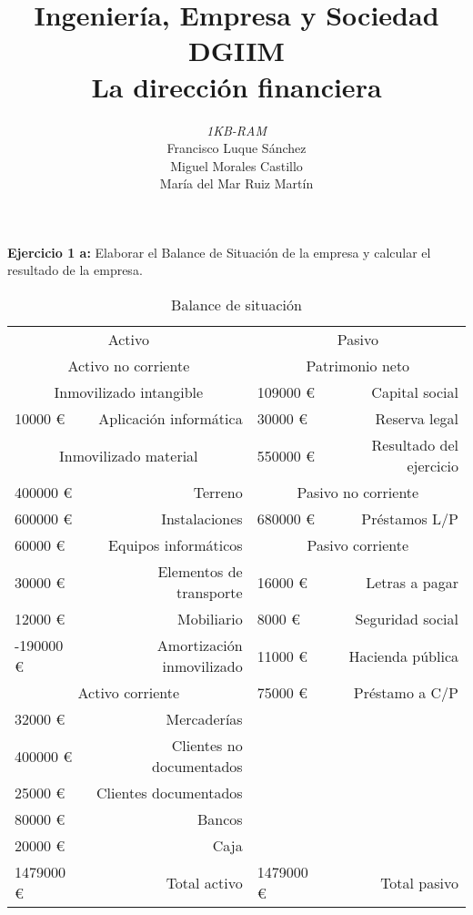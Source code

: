\documentclass[11pt]{article}
\theoremstyle{plain}
\theoremstyle{definition}
\begin{document}
\title{Ingeniería, Empresa y Sociedad \\
  DGIIM \\
  \large La dirección financiera}
\author{\textit{1KB-RAM}\\
  Francisco Luque Sánchez\\
  Miguel Morales Castillo\\
  María del Mar Ruiz Martín}

\maketitle

\textbf{Ejercicio 1 a:} Elaborar el Balance de Situación de la empresa
y calcular el resultado de la empresa.\\

\begin{table}[H]
  \centering
  \begin{tabular}{lrlr}
    \toprule
    \multicolumn{2}{c}{Activo} & \multicolumn{2}{c}{Pasivo} \\
    \cmidrule(r){1-2} \cmidrule(l){3-4}
    \multicolumn{2}{c}{Activo no corriente} & \multicolumn{2}{c}{Patrimonio neto} \\
    \cmidrule(r){1-2} \cmidrule(l){3-4}
    \multicolumn{2}{c}{Inmovilizado intangible} & 109000 € & Capital social\\
    \cmidrule(r){1-2}
    10000 € & Aplicación informática & 30000 € & Reserva legal \\
    \cmidrule(r){1-2}
    \multicolumn{2}{c}{Inmovilizado material} & 550000 € & Resultado del ejercicio \\
    \cmidrule(r){1-2} \cmidrule(l){3-4}
    400000 € & Terreno & \multicolumn{2}{c}{Pasivo no corriente} \\
    \cmidrule(l){3-4}
    600000 € & Instalaciones & 680000 € & Préstamos L/P \\
    \cmidrule(l){3-4}
    60000 € & Equipos informáticos & \multicolumn{2}{c}{Pasivo corriente} \\
    \cmidrule(l){3-4}
    30000 € & Elementos de transporte & 16000 € & Letras a pagar\\
    12000 € & Mobiliario & 8000 € & Seguridad social \\
    -190000 € & Amortización inmovilizado & 11000 € & Hacienda pública \\
    \cmidrule(r){1-2}
    \multicolumn{2}{c}{Activo corriente} & 75000 € & Préstamo a C/P  \\
    \cmidrule(r){1-2}
    32000 € & Mercaderías & & \\
    400000 € & Clientes no documentados & & \\
    25000 € & Clientes documentados & & \\
    80000 € & Bancos & & \\
    20000 € & Caja & & \\
    \midrule
    1479000 € & Total activo & 1479000 € & Total pasivo \\
    \bottomrule
  \end{tabular}
  \caption{Balance de situación}
\end{table}
\end{document}
